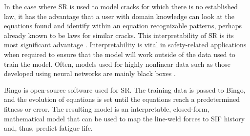In the case where SR is used to model cracks for which there is no established law, it has the advantage that a user with domain knowledge can look at the equations found and identify within an equation recognizable patterns, perhaps already known to be laws for similar cracks. This interpretability of SR is its most significant advantage \cite{otte2013safe,McConaghy2011,vladislavleva2008order}. Interpretability is vital in safety-related applications when required to ensure that the model will work outside of the data used to train the model. Often, models used for highly nonlinear data such as those developed using neural networks are mainly black boxes \cite{fujii1996bayesian}. 

Bingo \cite{bingosymbolicregression} is open-source software used for SR. The training data is passed to Bingo, and the evolution of equations is set until the equations reach a predetermined fitness or error. The resulting model is an interpretable, closed-form, mathematical model that can be used to map the line-weld forces to SIF history and, thus, predict fatigue life.
